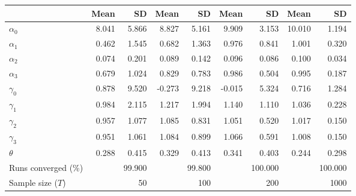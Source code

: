 
\begin{tabular}[t]{lrrrrrrrr}
\toprule
  & Mean & SD & Mean  & SD  & Mean   & SD   & Mean    & SD   \\
\midrule
$\alpha_{0}$ & 8.041 & 5.866 & 8.827 & 5.161 & 9.909 & 3.153 & 10.010 & 1.194\\
$\alpha_{1}$ & 0.462 & 1.545 & 0.682 & 1.363 & 0.976 & 0.841 & 1.001 & 0.320\\
$\alpha_{2}$ & 0.074 & 0.201 & 0.089 & 0.142 & 0.096 & 0.086 & 0.100 & 0.034\\
$\alpha_{3}$ & 0.679 & 1.024 & 0.829 & 0.783 & 0.986 & 0.504 & 0.995 & 0.187\\
$\gamma_{0}$ & 0.878 & 9.520 & -0.273 & 9.218 & -0.015 & 5.324 & 0.716 & 1.284\\
$\gamma_{1}$ & 0.984 & 2.115 & 1.217 & 1.994 & 1.140 & 1.110 & 1.036 & 0.228\\
$\gamma_{2}$ & 0.957 & 1.077 & 1.085 & 0.831 & 1.051 & 0.520 & 1.017 & 0.150\\
$\gamma_{3}$ & 0.951 & 1.061 & 1.084 & 0.899 & 1.066 & 0.591 & 1.008 & 0.150\\
$\theta$ & 0.288 & 0.415 & 0.329 & 0.413 & 0.341 & 0.403 & 0.244 & 0.298\\
Runs converged (\%) &  & 99.900 &  & 99.800 &  & 100.000 &  & 100.000\\
Sample size ($T$) &  & 50 &  & 100 &  & 200 &  & 1000\\
\bottomrule
\end{tabular}
